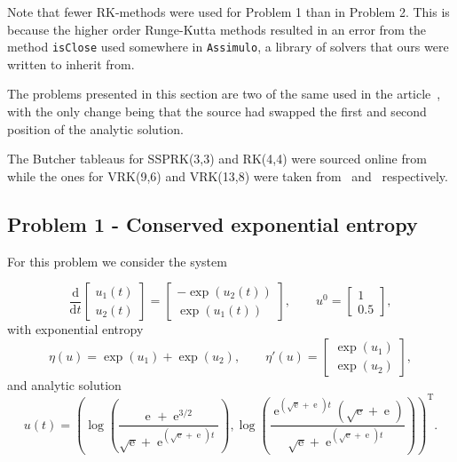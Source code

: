 \documentclass{article}
\renewcommand{\exp}[1]{\operatorname{e}^{#1}}
\newcommand{\expalt}{\operatorname{exp}}
\newcommand{\T}{\mathrm{T}}
\begin{document}
    \vspace*{5mm}
    Note that fewer RK-methods were used for Problem 1 than in Problem 2. This is because the higher order Runge-Kutta methods resulted in an error from the method \texttt{isClose} used somewhere in \texttt{Assimulo}, a library of solvers that ours were written to inherit from.

    \vspace*{5mm}
    The problems presented in this section are two of the same used in the article~\cite{Ranocha_2020}, with the only change being that the source had swapped the first and second position of the analytic solution.

    \vspace*{5mm}
    The Butcher tableaus for SSPRK(3,3) and RK(4,4) were sourced online from~\cite{wikipedia_RK} while the ones for VRK(9,6) and VRK(13,8) were taken from~\cite{VRK96} and~\cite{VRK138} respectively.

\subsection{Problem 1 - Conserved exponential entropy}
    For this problem we consider the system

    \[\frac{\text{d}}{\text{d}t}
    \begin{bmatrix}
        u_1(t)\\
        u_2(t)
    \end{bmatrix} =
    \begin{bmatrix}
        -\expalt(u_2(t))\\
        \expalt(u_1(t))
    \end{bmatrix}, \qquad u^0 =
    \begin{bmatrix}
        1\\
        0.5
    \end{bmatrix},
    \]
    with exponential entropy
    \[\eta(u) = \expalt(u_1) + \expalt(u_2), \qquad \eta'(u) =
    \begin{bmatrix}
        \expalt(u_1)\\
        \expalt(u_2)
    \end{bmatrix},
    \]
    and analytic solution
    \[u(t) = \left(\log\left(\frac{\exp{} + \exp{3/2}}{\sqrt{\exp{}} + \exp{(\sqrt{\exp{}}+\exp{})t}}\right), \log\left(\frac{\exp{(\sqrt{\exp{}}+\exp{})t}(\sqrt{\exp{}}+\exp{})}{\sqrt{\exp{}} + \exp{(\sqrt{\exp{}}+\exp{})t}}\right)\right)^{\T}.\]
\end{document}
